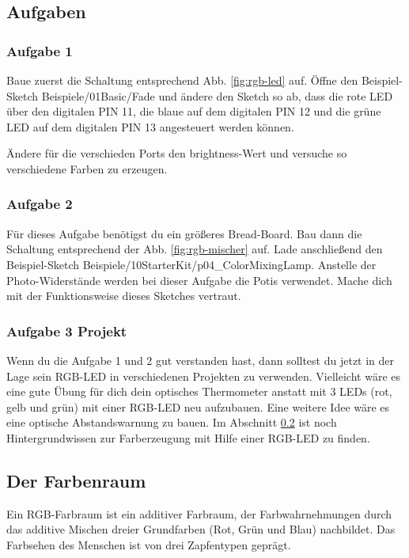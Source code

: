 \subsection{Aufgaben}

\subsubsection{Aufgabe 1}
Baue zuerst die Schaltung entsprechend Abb. \ref{fig:rgb-led} auf. Öffne den Beispiel-Sketch Beispiele/01Basic/Fade und ändere den Sketch so ab, dass die rote LED über den digitalen PIN 11, die blaue auf dem digitalen PIN 12 und die grüne LED auf dem digitalen PIN 13 angesteuert werden können. 

Ändere für die verschieden Ports den brightness-Wert und versuche so verschiedene Farben zu erzeugen. 

\subsubsection{Aufgabe 2}
Für dieses Aufgabe benötigst du ein größeres Bread-Board. Bau dann die Schaltung entsprechend der Abb. \ref{fig:rgb-mischer} auf. Lade anschließend den Beispiel-Sketch Beispiele/10StarterKit/p04\_ColorMixingLamp. Anstelle der Photo-Widerstände werden bei dieser Aufgabe die Potis verwendet. Mache dich mit der Funktionsweise dieses Sketches vertraut.  


\subsubsection{Aufgabe 3 Projekt}
Wenn du die Aufgabe 1 und 2 gut verstanden hast, dann solltest du jetzt in der Lage sein RGB-LED in verschiedenen Projekten zu verwenden. Vielleicht wäre es eine gute Übung für dich dein optisches Thermometer anstatt mit 3 LEDs (rot, gelb und grün) mit einer RGB-LED neu aufzubauen. Eine weitere Idee wäre es eine optische Abstandswarnung zu bauen. Im Abschnitt \ref{sec:farbenraum} ist noch Hintergrundwissen zur Farberzeugung mit Hilfe einer RGB-LED zu finden.     

\subsection{Der Farbenraum}\label{sec:farbenraum}
Ein RGB-Farbraum ist ein additiver Farbraum, der Farbwahrnehmungen durch das additive Mischen dreier Grundfarben (Rot, Grün und Blau) nachbildet. Das Farbsehen des Menschen ist von drei Zapfentypen geprägt. 


